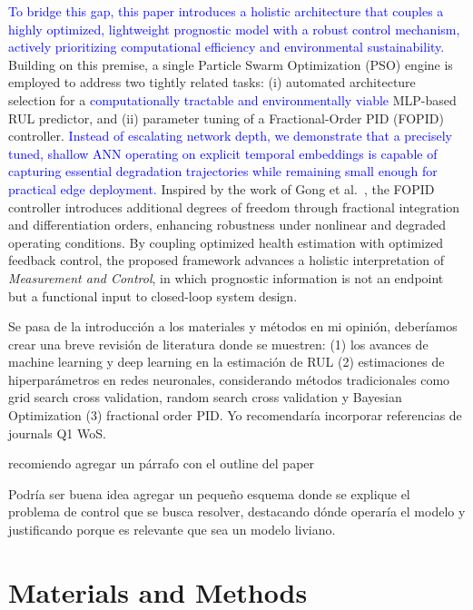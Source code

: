 \documentclass[12pt, a4paper]{article}
\begin{document}
\textcolor{blue}{To bridge this gap, this paper introduces a holistic architecture that couples a highly optimized, lightweight prognostic model with a robust control mechanism, actively prioritizing computational efficiency and environmental sustainability.} Building on this premise, a single Particle Swarm Optimization (PSO) engine is employed to address two tightly related tasks: (i) automated architecture selection for a \textcolor{blue}{computationally tractable and environmentally viable} MLP-based RUL predictor, and (ii) parameter tuning of a Fractional-Order PID (FOPID) controller. \textcolor{blue}{Instead of escalating network depth, we demonstrate that a precisely tuned, shallow ANN operating on explicit temporal embeddings is capable of capturing essential degradation trajectories while remaining small enough for practical edge deployment.} Inspired by the work of Gong et al.~\cite{Gong2023}, the FOPID controller introduces additional degrees of freedom through fractional integration and differentiation orders, enhancing robustness under nonlinear and degraded operating conditions. By coupling optimized health estimation with optimized feedback control, the proposed framework advances a holistic interpretation of \textit{Measurement and Control}, in which prognostic information is not an endpoint but a functional input to closed-loop system design.

\color{red} Se pasa de la introducción a los materiales y métodos en mi opinión, deberíamos crear una breve revisión de literatura donde se muestren:  (1) los avances de machine learning y deep learning en la estimación de RUL (2) estimaciones de hiperparámetros en redes neuronales, considerando métodos tradicionales como grid search cross validation, random search cross validation y Bayesian Optimization (3) fractional order PID. Yo recomendaría incorporar referencias de journals Q1 WoS. \color{black}

\color{red} recomiendo agregar un párrafo con el outline del paper

Podría ser buena idea agregar un pequeño esquema donde se explique el problema de control que se busca resolver, destacando dónde operaría el modelo y justificando porque es relevante que sea un modelo liviano. 
\color{black}

\section{Materials and Methods}
\end{document}

